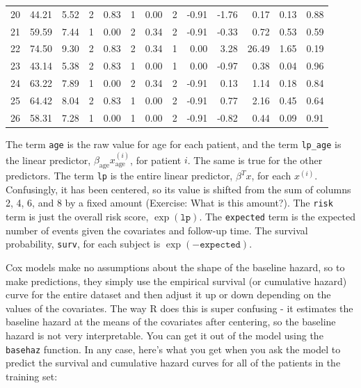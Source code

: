{\begin{center}
\begin{tabular}{rrrrrrrrrrrrr}
  20 & 44.21 & 5.52 & 2 & 0.83 & 1 & 0.00 & 2 & -0.91 & -1.76 & 0.17 & 0.13 & 0.88 \\ 
  21 & 59.59 & 7.44 & 1 & 0.00 & 2 & 0.34 & 2 & -0.91 & -0.33 & 0.72 & 0.53 & 0.59 \\ 
  22 & 74.50 & 9.30 & 2 & 0.83 & 2 & 0.34 & 1 & 0.00 & 3.28 & 26.49 & 1.65 & 0.19 \\ 
  23 & 43.14 & 5.38 & 2 & 0.83 & 1 & 0.00 & 1 & 0.00 & -0.97 & 0.38 & 0.04 & 0.96 \\ 
  24 & 63.22 & 7.89 & 1 & 0.00 & 2 & 0.34 & 2 & -0.91 & 0.13 & 1.14 & 0.18 & 0.84 \\ 
  25 & 64.42 & 8.04 & 2 & 0.83 & 1 & 0.00 & 2 & -0.91 & 0.77 & 2.16 & 0.45 & 0.64 \\ 
  26 & 58.31 & 7.28 & 1 & 0.00 & 1 & 0.00 & 2 & -0.91 & -0.82 & 0.44 & 0.09 & 0.91 \\ 
   \bottomrule
\end{tabular}
\end{center}
}

The term \texttt{age} is the raw value for age for each patient, and the term \texttt{lp\_age} is the linear predictor, $\beta_{\text{age}} x_{\text{age}}^{(i)}$, for patient $i$. The same is true for the other predictors. The term \texttt{lp} is the entire linear predictor, $\beta^Tx$, for each $x^{(i)}$. Confusingly, it has been centered, so its value is shifted from the sum of columns 2, 4, 6, and 8 by a fixed amount (Exercise: What is this amount?).  The \texttt{risk} term is just the overall risk score, $\exp(\texttt{lp})$. The \texttt{expected} term is the expected number of events given the covariates and follow-up time. The survival probability, \texttt{surv}, for each subject is $\exp(-\texttt{expected})$. %

Cox models make no assumptions about the shape of the baseline hazard, so to make predictions, they simply use the empirical survival (or cumulative hazard) curve for the entire dataset and then adjust it up or down depending on the values of the covariates. The way R does this is super confusing - it estimates the baseline hazard at the means of the covariates after centering, so the baseline hazard is not very interpretable. You can get it out of the model using the \texttt{basehaz} function. In any case, here's what you get when you ask the model to predict the survival and cumulative hazard curves for all of the patients in the training set:

